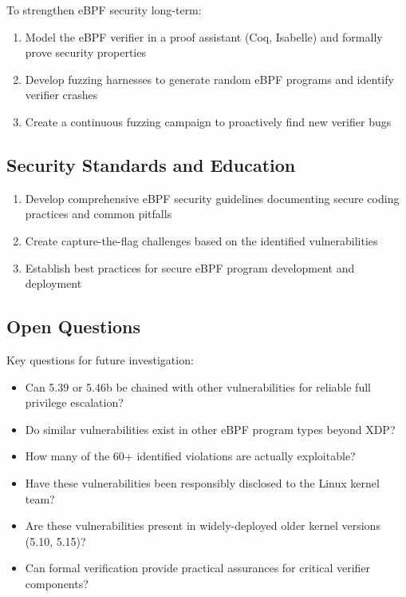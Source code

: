 To strengthen eBPF security long-term:

\begin{enumerate}[label=\arabic*.]
  \item Model the eBPF verifier in a proof assistant (Coq, Isabelle) and formally prove security properties
  \item Develop fuzzing harnesses to generate random eBPF programs and identify verifier crashes
  \item Create a continuous fuzzing campaign to proactively find new verifier bugs
\end{enumerate}

\subsection{Security Standards and Education}

\begin{enumerate}[label=\arabic*.]
  \item Develop comprehensive eBPF security guidelines documenting secure coding practices and common pitfalls
  \item Create capture-the-flag challenges based on the identified vulnerabilities
  \item Establish best practices for secure eBPF program development and deployment
\end{enumerate}

\subsection{Open Questions}

Key questions for future investigation:

\begin{itemize}
  \item Can 5.39 or 5.46b be chained with other vulnerabilities for reliable full privilege escalation?
  \item Do similar vulnerabilities exist in other eBPF program types beyond XDP?
  \item How many of the 60+ identified violations are actually exploitable?
  \item Have these vulnerabilities been responsibly disclosed to the Linux kernel team?
  \item Are these vulnerabilities present in widely-deployed older kernel versions (5.10, 5.15)?
  \item Can formal verification provide practical assurances for critical verifier components?
\end{itemize}


